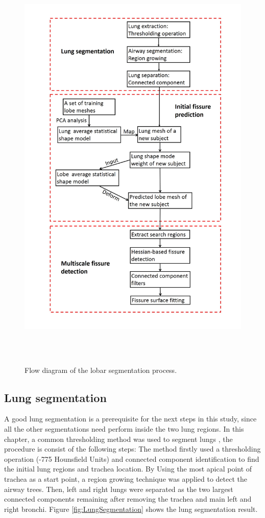 \begin{figure}[htbp]
  \centering 
  \includegraphics[height=8in]{Segmentation/Image/WholeWorkflow.jpg}
  \caption{Flow diagram of the lobar segmentation process.}
  \label{fig:WholeWorkflow}
\end{figure}

\subsection{Lung segmentation} \label{subsection:LungSegmentation}
A good lung segmentation is a prerequisite for the next steps in this study, since all the other segmentations need perform inside the two lung regions. In this chapter, a common thresholding method was used to segment lungs \citep{ukil2005smoothing}, the procedure is consist of the following steps: The method firstly used a thresholding operation (-775 Hounsfield Units) and connected component identification to find the initial lung regions and trachea location. By Using the most apical point of trachea as a start point, a region growing technique was applied to detect the airway trees. Then, left and right lungs were separated as the two largest connected components remaining after removing the trachea and main left and right bronchi. Figure \ref{fig:LungSegmentation} shows the lung segmentation result.

